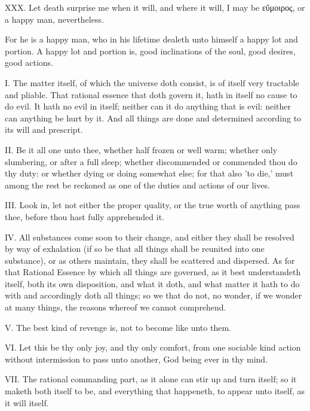 XXX. Let death surprise me when it will, and where it will, I may be
εὔμοιρος, or a happy man,
nevertheless.

For he is a happy man, who in his lifetime dealeth unto himself a happy
lot and portion. A happy lot and portion is, good inclinations of the
soul, good desires, good actions.


I. The matter itself, of which the universe doth consist, is of itself
very tractable and pliable. That rational essence that doth govern it,
hath in itself no cause to do evil. It hath no evil in itself; neither can
it do anything that is evil: neither can anything be hurt by it. And all
things are done and determined according to its will and prescript.

II. Be it all one unto thee, whether half frozen or well warm; whether
only slumbering, or after a full sleep; whether discommended or commended
thou do thy duty: or whether dying or doing somewhat else; for that also
'to die,' must among the rest be reckoned as one of the duties and actions
of our lives.

III. Look in, let not either the proper quality, or the true worth of
anything pass thee, before thou hast fully apprehended it.

IV. All substances come soon to their change, and either they shall
be resolved by way of exhalation (if so be that all things shall be
reunited into one substance), or as others maintain, they shall be
scattered and dispersed. As for that Rational Essence by which all things
are governed, as it best understandeth itself, both its own disposition,
and what it doth, and what matter it hath to do with and accordingly doth
all things; so we that do not, no wonder, if we wonder at many things, the
reasons whereof we cannot comprehend.

V. The best kind of revenge is, not to become like unto them.

VI. Let this be thy only joy, and thy only comfort, from one sociable
kind action without intermission to pass unto another, God being ever in
thy mind.

VII. The rational commanding part, as it alone can stir up and turn
itself; so it maketh both itself to be, and everything that happeneth, to
appear unto itself, as it will itself.

